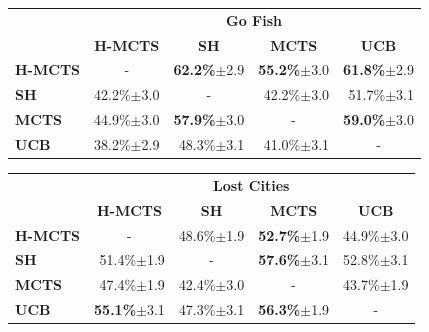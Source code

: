 \documentclass[a4paper]{llncs}
\begin{document}
\begin{table}[ht]
\centering
\setlength{\tabcolsep}{10pt}

\begin{tabular}{@{}lrrrr@{}}
\toprule
& \multicolumn{4}{c}{\textbf{Go Fish}} \\
& \multicolumn{1}{c}{\textbf{H-MCTS}} & \multicolumn{1}{c}{\textbf{SH}} & \multicolumn{1}{c}{\textbf{MCTS}} & \multicolumn{1}{c}{\textbf{UCB}} \\[1mm] \cmidrule(l){2-5} 
\textbf{H-MCTS} & \multicolumn{1}{c}{-}		& \textbf{62.2\%}$\pm$2.9 	& \textbf{55.2\%}$\pm$3.0 	& \textbf{61.8\%}$\pm$2.9 	\\[.5mm] 
\textbf{SH}     & 42.2\%$\pm$3.0 			& \multicolumn{1}{c}{-} 	& 42.2\%$\pm$3.0 			& 51.7\%$\pm$3.1 			\\[.5mm] 
\textbf{MCTS}   & 44.9\%$\pm$3.0			& \textbf{57.9\%}$\pm$3.0 	& \multicolumn{1}{c}{-} 	& \textbf{59.0\%}$\pm$3.0 	\\[.5mm]
\textbf{UCB}	& 38.2\%$\pm$2.9			& 48.3\%$\pm$3.1			& 41.0\%$\pm$3.1 			& \multicolumn{1}{c}{-} 	\\[.5mm] 
\end{tabular}

\begin{tabular}{@{}lrrrr@{}}
\toprule
& \multicolumn{4}{c}{\textbf{Lost Cities}} \\
& \multicolumn{1}{c}{\textbf{H-MCTS}} & \multicolumn{1}{c}{\textbf{SH}} & \multicolumn{1}{c}{\textbf{MCTS}} & \multicolumn{1}{c}{\textbf{UCB}} \\ [1mm] \cmidrule(l){2-5} 
\textbf{H-MCTS} & \multicolumn{1}{c}{-}		& 48.6\%$\pm$1.9 			& \textbf{52.7\%}$\pm$1.9		  	& 44.9\%$\pm$3.0 	\\[.5mm] 
\textbf{SH}     & 51.4\%$\pm$1.9 			& \multicolumn{1}{c}{-} 	& \textbf{57.6\%}$\pm$3.1  	& 52.8\%$\pm$3.1  			\\[.5mm] 
\textbf{MCTS}   & 47.4\%$\pm$1.9		 	& 42.4\%$\pm$3.0  			& \multicolumn{1}{c}{-} 	& 43.7\%$\pm$1.9  			\\[.5mm]
\textbf{UCB}	& \textbf{55.1\%}$\pm$3.1	& 47.3\%$\pm$3.1  			& \textbf{56.3\%}$\pm$1.9 	& \multicolumn{1}{c}{-} 	\\[.5mm]
\end{tabular}


\end{table}
\end{document}
